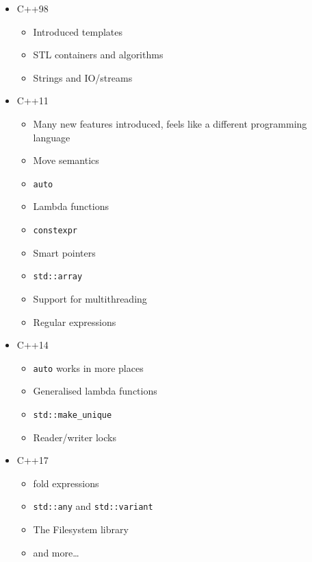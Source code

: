 \begin{itemize}
\tightlist
\item
  C++98

  \begin{itemize}
  \tightlist
  \item
    Introduced templates
  \item
    STL containers and algorithms
  \item
    Strings and IO/streams\\
  \end{itemize}
\item
  C++11

  \begin{itemize}
  \tightlist
  \item
    Many new features introduced, feels like a different programming
    language
  \item
    Move semantics
  \item
    \texttt{auto}
  \item
    Lambda functions
  \item
    \texttt{constexpr}
  \item
    Smart pointers
  \item
    \texttt{std::array}
  \item
    Support for multithreading
  \item
    Regular expressions
  \end{itemize}
\item
  C++14

  \begin{itemize}
  \tightlist
  \item
    \texttt{auto} works in more places
  \item
    Generalised lambda functions
  \item
    \texttt{std::make\_unique}
  \item
    Reader/writer locks
  \end{itemize}
\item
  C++17

  \begin{itemize}
  \tightlist
  \item
    fold expressions
  \item
    \texttt{std::any} and \texttt{std::variant}
  \item
    The Filesystem library
  \item
    and more\ldots{}
  \end{itemize}
\end{itemize}


